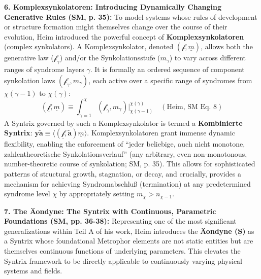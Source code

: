 \documentclass[
    12pt,              %
    a4paper,           %
    headings=normal,   %
    twoside=true,      %
    BCOR=8mm,          %
]{scrbook}
\newcommand{\q}[1]{\enquote{#1}}
\newcommand{\syntrix}{\bm{y\widetilde{a}}}
\newcommand{\metrophor}{\bm{\widetilde{a}}}
\newcommand{\synkolator}{\mathcal{f}}
\newcommand{\synkolationsstufe}{m}
\begin{document}
\textbf{6. Komplexsynkolatoren: Introducing Dynamically Changing Generative Rules (SM, p. 35):}
To model systems whose rules of development or structure formation might themselves change over the course of their evolution, Heim introduced the powerful concept of \textbf{Komplexsynkolatoren} (complex synkolators). A Komplexsynkolator, denoted \((\underline{\synkolator}, \underline{\synkolationsstufe})\), allows both the generative law (\(\synkolator_\gamma\)) and/or the Synkolationsstufe (\(\synkolationsstufe_\gamma\)) to vary across different ranges of syndrome layers \(\gamma\). It is formally an ordered sequence of component synkolation laws \((\synkolator_\gamma, \synkolationsstufe_\gamma)\), each active over a specific range of syndromes from \(\chi(\gamma-1)\) to \(\chi(\gamma)\):
\begin{equation} \label{eq:original_komplexsynkolator} 
(\underline{\synkolator},\underline{\synkolationsstufe}) \equiv \int_{\gamma=1}^\chi (\synkolator_\gamma, \synkolationsstufe_\gamma) \Big|_{\chi(\gamma-1)}^{\chi(\gamma)} \quad (\text{Heim, SM Eq. 8})
\end{equation}
A Syntrix governed by such a Komplexsynkolator is termed a \textbf{Kombinierte Syntrix}: \(\syntrix \equiv \langle (\underline{\synkolator}, \metrophor) \underline{\synkolationsstufe} \rangle\). Komplexsynkolatoren grant immense dynamic flexibility, enabling the enforcement of \q{jeder beliebige, auch nicht monotone, zahlentheoretische Synkolationsverlauf} (any arbitrary, even non-monotonous, number-theoretic course of synkolation; SM, p. 35). This allows for sophisticated patterns of structural growth, stagnation, or decay, and crucially, provides a mechanism for achieving Syndromabschluß (termination) at any predetermined syndrome level \(\chi\) by appropriately setting \(\synkolationsstufe_\chi > n_{\chi-1}\).

\textbf{7. The Äondyne: The Syntrix with Continuous, Parametric Foundations (SM, pp. 36-38):}
Representing one of the most significant generalizations within Teil A of his work, Heim introduces the \textbf{Äondyne (\(\underline{\bm{S}}\))} as a Syntrix whose foundational Metrophor elements are not static entities but are themselves continuous functions of underlying parameters. This elevates the Syntrix framework to be directly applicable to continuously varying physical systems and fields.
\end{document}
